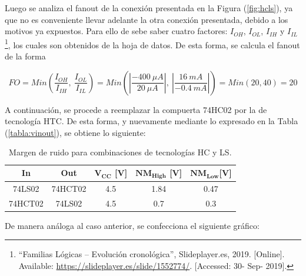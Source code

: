 Luego se analiza el fanout de la conexión presentada en la Figura (\ref{fig:hcls}), ya que no es conveniente llevar adelante la otra conexión presentada, debido a los motivos ya expuestos. Para ello de sebe saber cuatro factores: $I_{OH}$, $I_{OL}$, $I_{IH}$ y $I_{IL}$\footnote{``Familias Lógicas – Evolución cronológica'', Slideplayer.es, 2019. [Online]. Available: \url{https://slideplayer.es/slide/1552774/}. [Accessed: 30- Sep- 2019].}, los cuales son obtenidos de la hoja de datos. De esta forma, se calcula el fanout de la forma

\begin{equation*}
	FO = Min \left( \frac{I_{OH}}{I_{IH}}, \ \frac{I_{OL}}{I_{IL}} \right) = Min \left( \left| \frac{-400 \ \mu A}{20 \ \mu A} \right|, \ \left| \frac{16 \ mA}{-0.4 \ mA}\right| \right) = Min \left( 20 , 40 \right) = 20
\end{equation*}

A continuación, se procede a reemplazar la compuerta 74HC02 por la de tecnología HTC. De esta forma, y nuevamente mediante lo expresado en la Tabla (\ref{tabla:vinout}), se obtiene lo siguiente:

\begin{table}[H]
\centering
\begin{tabular}{|c|c|c|c|c|}
\hline
\textbf{In} & \textbf{Out} & $\mathbf{V_{CC}}$ \textbf{[V]} & $\mathbf{NM_{High}}$ \textbf{[V]} & $\mathbf{NM_{Low}} $\textbf{[V]} \\ \hline
74LS02      & 74HCT02       & 4.5                            & 1.84                              & 0.47                              \\ 
74HCT02      & 74LS02       & 4.5                            & 0.7                             & 0.3     		                    \\ \hline
\end{tabular}
\caption{Margen de ruido para combinaciones de tecnologías HC y LS.}
\label{tabla:nm2}
\end{table}

De manera análoga al caso anterior, se confecciona el siguiente gráfico:


